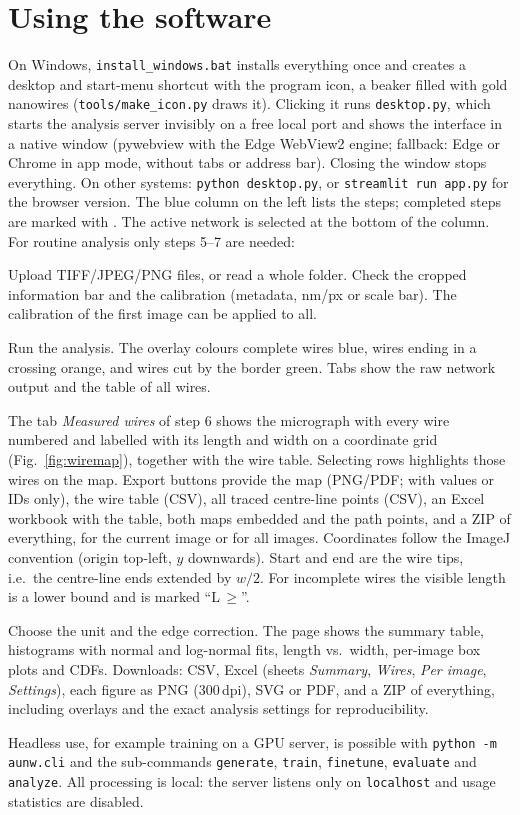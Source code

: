 \documentclass[11pt,a4paper]{article}
\newcommand{\code}[1]{\texttt{#1}}
\begin{document}
\section{Using the software}
On Windows, \code{install\_windows.bat} installs everything once and creates a desktop and start-menu shortcut with the program icon, a beaker filled with gold nanowires (\code{tools/make\_icon.py} draws it). Clicking it runs \code{desktop.py}, which starts the analysis server invisibly on a free local port and shows the interface in a native window (pywebview with the Edge WebView2 engine; fallback: Edge or Chrome in app mode, without tabs or address bar). Closing the window stops everything. On other systems: \code{python desktop.py}, or \code{streamlit run app.py} for the browser version. The blue column on the left lists the steps; completed steps are marked with \checkmark. The active network is selected at the bottom of the column. For routine analysis only steps 5--7 are needed:
\begin{description}[leftmargin=1.2em,itemsep=1pt]
\item[Step 5] Upload TIFF/JPEG/PNG files, or read a whole folder. Check the cropped information bar and the calibration (metadata, nm/px or scale bar). The calibration of the first image can be applied to all.
\item[Step 6] Run the analysis. The overlay colours complete wires blue, wires ending in a crossing orange, and wires cut by the border green. Tabs show the raw network output and the table of all wires.
\item[Per-wire results] The tab \emph{Measured wires} of step 6 shows the micrograph with every wire numbered and labelled with its length and width on a coordinate grid (Fig.~\ref{fig:wiremap}), together with the wire table. Selecting rows highlights those wires on the map. Export buttons provide the map (PNG/PDF; with values or IDs only), the wire table (CSV), all traced centre-line points (CSV), an Excel workbook with the table, both maps embedded and the path points, and a ZIP of everything, for the current image or for all images. Coordinates follow the ImageJ convention (origin top-left, $y$ downwards). Start and end are the wire tips, i.e.\ the centre-line ends extended by $w/2$. For incomplete wires the visible length is a lower bound and is marked ``L\,$\ge$''.
\item[Step 7] Choose the unit and the edge correction. The page shows the summary table, histograms with normal and log-normal fits, length vs.\ width, per-image box plots and CDFs. Downloads: CSV, Excel (sheets \emph{Summary}, \emph{Wires}, \emph{Per image}, \emph{Settings}), each figure as PNG (300\,dpi), SVG or PDF, and a ZIP of everything, including overlays and the exact analysis settings for reproducibility.
\end{description}
Headless use, for example training on a GPU server, is possible with \code{python -m aunw.cli} and the sub-commands \code{generate}, \code{train}, \code{finetune}, \code{evaluate} and \code{analyze}. All processing is local: the server listens only on \code{localhost} and usage statistics are disabled.
\end{document}
